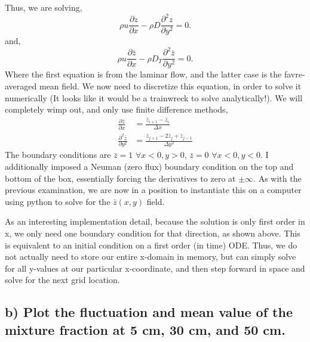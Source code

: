 \documentclass{article}
\begin{document}
Thus, we are solving, 
\begin{equation}
\rho u \frac{\partial z}{\partial x} - \rho D \frac{\partial^2
  z}{\partial y^2} = 0. 
\end{equation}
and, 
\begin{equation}
\rho u \frac{\partial \bar z}{\partial x} - \rho D_T \frac{\partial^2
  \bar z}{\partial y^2} = 0. 
\end{equation}
Where the first equation is from the laminar flow, and the latter case
is the favre-averaged mean field. We now need to discretize this equation, 
in order to solve it numerically (It looks like it would be a trainwreck to solve
analytically!). We will completely wimp out, and only use finite difference methods, 
\begin{align}
  \frac{\partial \bar z}{\partial x} &= \frac{\bar z_{i+1}-\bar z_{i}}{\Delta x} \\
  \label{first}
  \frac{\partial^2 \bar z}{\partial y^2} &= \frac{\bar z_{j+1}-2\bar z_{j}+\bar z_{j-1}}{\Delta y^2} 
\end{align}
The boundary conditions are $\bar z = 1$ $\forall x<0,y>0$, $\bar z = 0$ $\forall x<0,y<0$. 
I additionally imposed a Neuman (zero flux) boundary condition on the top and bottom of the box, 
essentially forcing the derivatives to zero at $\pm \infty$. As with the previous examination, 
we are now in a position to instantiate this on a computer using python to solve for 
the $\bar z(x,y)$ field. 

As an interesting implementation detail, because the solution is only
first order in x, we only need one boundary condition for that
direction, as shown above. This is equivalent to an initial condition on
a first order (in time) ODE. Thus, we do not actually need to store our
entire x-domain in memory, but can simply solve for all y-values at our
particular x-coordinate, and then step forward in space and solve for
the next grid location. 
%
%
%
%
\subsection*{b) Plot the fluctuation and mean value of the mixture fraction
  at 5 cm, 30 cm, and 50 cm.}
\end{document}
